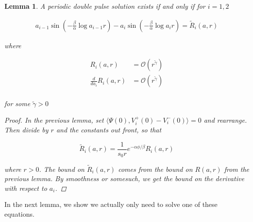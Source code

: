 \documentclass[12pt]{article}
\newtheorem{lemma}{Lemma}
\begin{document}

\begin{lemma}\label{systemtosolve}
A periodic double pulse solution exists if and only if for $i = 1, 2$

\begin{align*}
a_{i-1} \sin \left( - \frac{\beta}{\alpha} \log a_{i-1} r \right) - a_i \sin \left( - \frac{\beta}{\alpha} \log a_i r \right) = \tilde{R}_i(a, r)
\end{align*}

where 

\begin{align*}
R_i(a, r) &= \mathcal{O}(r^{\tilde{\gamma}}) \\
\frac{d}{d a_i} R_i(a, r) &= \mathcal{O}(r^{\tilde{\gamma}}) \\
\end{align*}

for some $\tilde{\gamma} > 0$

\begin{proof}
In the previous lemma, set $\langle \Psi(0), V_i^+(0) - V_i^-(0) \rangle = 0$ and rearrange. Then divide by $r$ and the constants out front, so that

\[
\tilde{R}_i(a, r) = \frac{1}{s_0 r} e^{-\alpha \phi / \beta } R_i(a, r)
\]

where $r > 0$. The bound on $\tilde{R}_i(a, r)$ comes from the bound on $R(a, r)$ from the previous lemma. By smoothness or somesuch, we get the bound on the derivative with respect to $a_i$.
\end{proof}
\end{lemma}

In the next lemma, we show we actually only need to solve one of these equations.

\end{document}
